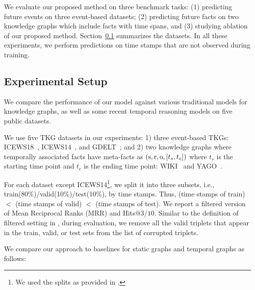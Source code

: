 We evaluate our proposed method on three benchmark tasks: (1) predicting future events on three event-based datasets; (2) predicting future facts on two knowledge graphs which include facts with time spans, and (3) studying ablation of our proposed method.
Section~\ref{exp:setup} summarizes the datasets.
In all these experiments, we perform predictions on time stamps that are not observed during training.







\subsection{Experimental Setup}
\label{exp:setup}
We compare the performance of our model against various traditional models for knowledge graphs, as well as some recent temporal reasoning models on five public datasets.

We use five TKG datasets in our experiments: 1) three event-based TKGs: ICEWS18~\citep{boschee2015icews}, ICEWS14~\citep{Trivedi2017KnowEvolveDT}, and GDELT~\citep{leetaru2013gdelt}; and 2) two knowledge graphs where temporally associated facts have meta-facts as $(\mathrm{s},\mathrm{r},\mathrm{o}, [t_s, t_e])$ where $t_s$ is the starting time point and $t_e$ is the ending time point:  WIKI~\citep{leblay2018deriving} and YAGO~\citep{Mahdisoltani2014YAGO3AK}.



For each dataset 
except ICEWS14\footnote{We used the splits as provided in \citep{Trivedi2017KnowEvolveDT}.}, 
we split it into three subsets, i.e., train(80\%)/valid(10\%)/test(10\%), by time stamps. Thus, (time stamps of train) $<$ (time stamps of valid) $<$ (time stamps of test).
We report a filtered version of Mean Reciprocal Ranks (MRR) and Hits$@3$/$10$. 
Similar to the definition of filtered setting in \citep{Bordes2013TranslatingEF}, during evaluation, we remove all the valid triplets that appear in the train, valid, or test sets from the list of corrupted triplets.





We compare our approach to baselines for static graphs and temporal graphs as follows:

